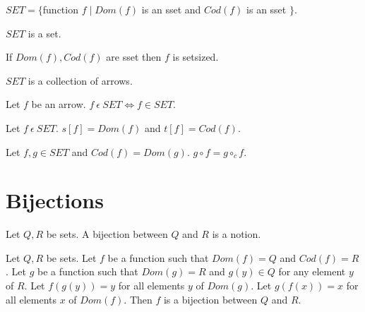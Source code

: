 \documentclass{article}
\newcommand{\mcirc}{\circ_{c}}
\newcommand{\inn}{~\epsilon~}
\newcommand{\innn}{~\epsilon~} %
\begin{document}
\begin{forthel}
		\begin{definition} 
		\begin{center}
			$SET = \{ $function $f \mid Dom(f)$ is an sset and $Cod(f)$ is an sset $\}$.
		\end{center}
			
		\end{definition}
		
		\begin{axiom} 
			$SET$ is a set.
		\end{axiom}
		
		\begin{axiom} 
			If $Dom(f), Cod(f)$ are sset then $f$ is setsized.
		\end{axiom}
		

		

		
		\begin{axiom}
			$SET$ is a collection of arrows.
		\end{axiom}


		
		\begin{axiom}
			Let $f$ be an arrow. $f \inn SET \iff f \in SET$.
		\end{axiom}
		
		\begin{axiom}
		  Let $f \innn SET$. $s[f]=Dom(f)$ and $t[f]=Cod(f)$.
		\end{axiom}
		
		\begin{axiom} 
			Let $f,g \in SET$ and $Cod(f)=Dom(g)$. $g \circ f = g \mcirc f$.
		\end{axiom}

	
		


	\end{forthel}
	
		
	\section{Bijections}
	
	\begin{forthel}
		
		\begin{signature}
			Let $Q,R$ be sets.
			A bijection between $Q$ and $R$ is a notion.
		\end{signature}

		\begin{axiom}
			Let $Q,R$ be sets.
			Let $f$ be a function such that $Dom(f) = Q$ and $Cod(f)=R$.
			Let $g$ be a function such that $Dom(g) = R$ and $g(y) \in Q$ for any element $y$ of $R$.
			Let $f(g(y))=y$ for all elements $y$ of $Dom(g)$. 
			Let $g(f(x))=x$ for all elements $x$ of $Dom(f)$.
			Then $f$ is a bijection between $Q$ and $R$.
		\end{axiom}
		
	\end{forthel}
	
\end{document}
